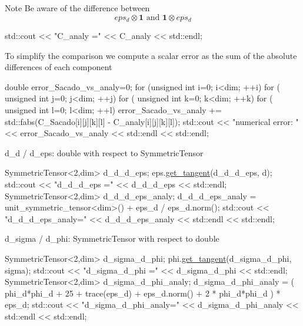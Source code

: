  \begin{DoxyNote}{Note}
Be aware of the difference between \[ eps_d \otimes \boldsymbol{1} \text{ and } \boldsymbol{1} \otimes eps_d \] 
\begin{DoxyCode}
std::cout << \textcolor{stringliteral}{"C\_analy ="} << C\_analy << std::endl;
\end{DoxyCode}
 To simplify the comparison we compute a scalar error as the sum of the absolute differences of each component 
\begin{DoxyCode}
\textcolor{keywordtype}{double} error\_Sacado\_vs\_analy=0;
\textcolor{keywordflow}{for} (\textcolor{keywordtype}{unsigned} \textcolor{keywordtype}{int} i=0; i<dim; ++i)
     \textcolor{keywordflow}{for} ( \textcolor{keywordtype}{unsigned} \textcolor{keywordtype}{int} j=0; j<dim; ++j)
         \textcolor{keywordflow}{for} ( \textcolor{keywordtype}{unsigned} \textcolor{keywordtype}{int} k=0; k<dim; ++k)
             \textcolor{keywordflow}{for} ( \textcolor{keywordtype}{unsigned} \textcolor{keywordtype}{int} l=0; l<dim; ++l)
                 error\_Sacado\_vs\_analy += std::fabs(C\_Sacado[i][j][k][l] - C\_analy[i][j][k][l]);
std::cout << \textcolor{stringliteral}{"numerical error: "} << error\_Sacado\_vs\_analy << std::endl << std::endl;
\end{DoxyCode}
 d\+\_\+d / d\+\_\+eps\+: double with respect to Symmetric\+Tensor 
\begin{DoxyCode}
SymmetricTensor<2,dim> d\_d\_d\_eps;
eps.\hyperlink{classSacado__Wrapper_1_1SymTensor_ab97427c3b5cab279e58607cf431ab262}{get\_tangent}(d\_d\_d\_eps, d);
std::cout << \textcolor{stringliteral}{"d\_d\_d\_eps      ="} << d\_d\_d\_eps << std::endl;
SymmetricTensor<2,dim> d\_d\_d\_eps\_analy;
d\_d\_d\_eps\_analy = unit\_symmetric\_tensor<dim>() + eps\_d / eps\_d.norm();
std::cout << \textcolor{stringliteral}{"d\_d\_d\_eps\_analy="} << d\_d\_d\_eps\_analy << std::endl << std::endl;
\end{DoxyCode}
 d\+\_\+sigma / d\+\_\+phi\+: Symmetric\+Tensor with respect to double 
\begin{DoxyCode}
SymmetricTensor<2,dim> d\_sigma\_d\_phi;
phi.\hyperlink{classSacado__Wrapper_1_1SW__double_a2e6eca4457eb22b06172bb5749038f1e}{get\_tangent}(d\_sigma\_d\_phi, sigma);
std::cout << \textcolor{stringliteral}{"d\_sigma\_d\_phi      ="} << d\_sigma\_d\_phi << std::endl;
SymmetricTensor<2,dim> d\_sigma\_d\_phi\_analy;
d\_sigma\_d\_phi\_analy = ( phi\_d*phi\_d + 25 + trace(eps\_d) + eps\_d.norm() + 2 * phi\_d*phi\_d ) * eps\_d;
std::cout << \textcolor{stringliteral}{"d\_sigma\_d\_phi\_analy="} << d\_sigma\_d\_phi\_analy << std::endl << std::endl;

\end{DoxyCode}
\end{DoxyNote}
